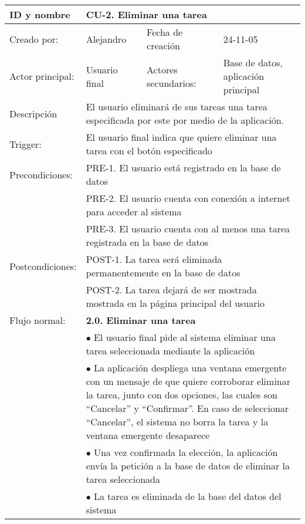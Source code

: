 \begin{center}
\begin{tabular}{p{3cm}p{5cm}p{4cm}p{2cm}}
  \hline
  ID y nombre & \multicolumn{3}{p{11cm}}{CU-2. Eliminar una tarea}\\
  \hline
  Creado por: & Alejandro & Fecha de creaci\'on & 24-11-05\\
  \hline
  Actor principal: & Usuario final & Actores secundarios: & Base de datos, aplicaci\'on principal\\
  \hline
  Descripci\'on & \multicolumn{3}{p{11cm}}{El usuario eliminar\'a de sus tareas una tarea especificada por este por medio de la aplicaci\'on.}\\
  \hline
  Trigger: & \multicolumn{3}{p{11cm}}{El usuario final indica que quiere eliminar una tarea con el bot\'on especificado}\\
  \hline
  Precondiciones: & \multicolumn{3}{p{11cm}}{PRE-1. El usuario est\'a registrado en la base de datos}\\
		  & \multicolumn{3}{p{11cm}}{PRE-2. El usuario cuenta con conexi\'on a internet para acceder al sistema}\\
		  & \multicolumn{3}{p{11cm}}{PRE-3. El usuario cuenta con al menos una tarea registrada en la base de datos}\\
  \hline
  Postcondiciones: & \multicolumn{3}{p{11cm}}{POST-1. La tarea ser\'a eliminada permanentemente en la base de datos}\\
		   & \multicolumn{3}{p{11cm}}{POST-2. La tarea dejar\'a de ser mostrada mostrada en la p\'agina principal del usuario}\\
  \hline
  Flujo normal: & \multicolumn{3}{p{11cm}}{\textbf{2.0. Eliminar una tarea}}\\
		& \multicolumn{3}{p{11cm}}{$\bullet$ El usuario final pide al sistema eliminar una tarea seleccionada mediante la aplicaci\'on}\\
		& \multicolumn{3}{p{11cm}}{$\bullet$ La aplicaci\'on despliega una ventana emergente con un mensaje de que quiere corroborar eliminar la tarea, junto con dos opciones, las cuales son ``Cancelar'' y ``Confirmar''. En caso de seleccionar ``Cancelar'', el sistema no borra la tarea y la ventana emergente desaparece}\\
		& \multicolumn{3}{p{11cm}}{$\bullet$ Una vez confirmada la elecci\'on, la aplicaci\'on env\'ia la petici\'on a la base de datos de eliminar la tarea seleccionada}\\
		& \multicolumn{3}{p{11cm}}{$\bullet$ La tarea es eliminada de la base del datos del sistema}\\

\end{tabular}
\end{center}
